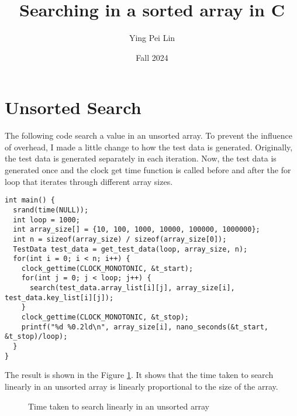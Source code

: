 \documentclass[a4paper,11pt]{article}
\begin{document}
\title{
  \textbf{Searching in a sorted array in C}
}
\author{Ying Pei Lin}
\date{Fall 2024}

\maketitle

\section*{Unsorted Search}
The following code search a value in an unsorted array. To prevent the influence of overhead,
I made a little change to how the test data is generated. Originally, the test data is generated separately
in each iteration. Now, the test data is generated once and the clock get time function is called before and after
the for loop that iterates through different array sizes.

\begin{verbatim}
int main() {
  srand(time(NULL));
  int loop = 1000;
  int array_size[] = {10, 100, 1000, 10000, 100000, 1000000};
  int n = sizeof(array_size) / sizeof(array_size[0]);
  TestData test_data = get_test_data(loop, array_size, n);
  for(int i = 0; i < n; i++) {
    clock_gettime(CLOCK_MONOTONIC, &t_start);
    for(int j = 0; j < loop; j++) {
      search(test_data.array_list[i][j], array_size[i], test_data.key_list[i][j]);
    }
    clock_gettime(CLOCK_MONOTONIC, &t_stop);
    printf("%d %0.2ld\n", array_size[i], nano_seconds(&t_start, &t_stop)/loop);
  }
}
\end{verbatim}

The result is shown in the Figure \ref{fig:unsorted_search}. It shows that the time taken to 
search linearly in an unsorted array is linearly proportional to the size of the array.

\begin{figure}[H]
  \centering
  \caption{Time taken to search linearly in an unsorted array}
  \label{fig:unsorted_search}
\end{figure}
\end{document}
